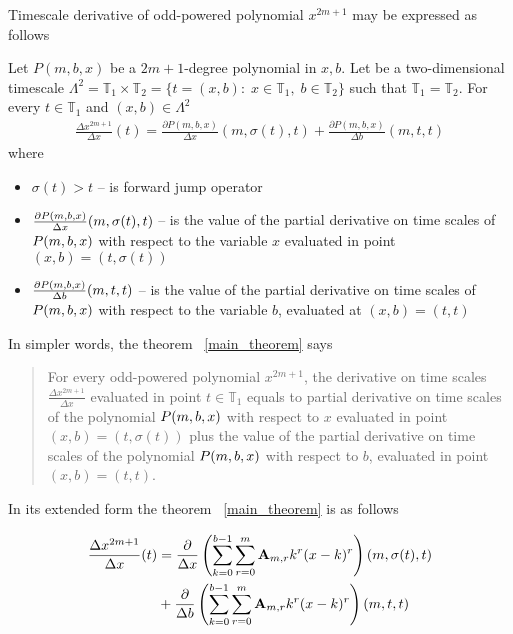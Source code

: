 Timescale derivative of odd-powered polynomial $x^{2m+1}$ may be expressed as follows
\begin{thm}
    \label{main_theorem}
    Let $P(m,b,x)$ be a $2m+1$-degree polynomial in $x,b$.
    Let be a two-dimensional timescale
    $\Lambda^2 = \mathbb{T}_1 \times \mathbb{T}_2 = \{t=(x, b) \colon \; x\in\mathbb{T}_1, \; b\in\mathbb{T}_2 \}$
    such that $\mathbb{T}_1 = \mathbb{T}_2$.
    For every $t\in\mathbb{T}_1$ and $(x,b) \in \Lambda^2$
    \begin{align*}
        \frac{\Delta x^{2m+1}}{\Delta x}(t) =
        \frac{\partial P(m,b,x)}{\Delta x} (m, \sigma(t), t) +
        \frac{\partial P(m,b,x)}{\Delta b} (m, t, t)
    \end{align*}
    where
    \begin{itemize}
        \setlength\itemsep{1em}
        \item  $\sigma(t) > t$ -- is forward jump operator

        \item $\frac{\partial P ( m, b, x )}{\Delta x} (m, \sigma(t), t)$ --
        is the value of the partial derivative on time scales of
        $P ( m, b, x )$ with respect to the variable $x$ evaluated in point $(x, b)=  (t, \sigma(t))$

        \item $\frac{\partial P ( m, b, x )}{\Delta b} (m, t, t)$ --
        is the value of the partial derivative on time scales of
        $P ( m, b, x )$ with respect to the variable $b$, evaluated at $(x,b) = (t, t)$
    \end{itemize}
\end{thm}
In simpler words, the theorem ~\ref{main_theorem} says
\begin{center}
    \begin{quotation}
        For every odd-powered polynomial $x^{2m+1}$, the derivative on time scales $\frac{\Delta x^{2m+1}}{\Delta x}$
        evaluated in point $t\in\mathbb{T}_1$ equals to partial derivative on time scales of the polynomial
        $P ( m, b, x )$
        with respect to $x$
        evaluated in point
        $(x,b) = (t, \sigma(t))$
        plus the value of the partial derivative on time scales of the polynomial
        $P ( m, b, x )$
        with respect to $b$,
        evaluated in point
        $(x,b)=(t,t)$.
    \end{quotation}
\end{center}

In its extended form the theorem ~\eqref{main_theorem} is as follows

\begin{align*}
    \frac{\Delta x^{2m+1}}{\Delta x}(t)
    &= \frac{\partial}{\Delta x} \left( \sum_{k=0}^{b-1} \sum_{r=0}^{m} {\mathbf{A}} \sb{m,r} k^r(x-k)^r \right) (m, \sigma(t), t) \\
    &+ \frac{\partial}{\Delta b} \left( \sum_{k=0}^{b-1} \sum_{r=0}^{m} {\mathbf{A}} \sb{m,r} k^r(x-k)^r \right) (m, t, t)
\end{align*}
